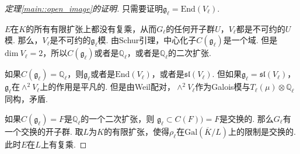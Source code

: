 \begin{proof}[定理\ref{main::open_image}的证明]
    只需要证明$\mathfrak{g}_{\ell} = \mathrm{End}(V_{\ell})$.

    $E$在$K$的所有有限扩张上都没有复乘，从而$G_{\ell}$的任何开子群$U$，$V_{\ell}$都是不可约的$U$模. 那么，$V_{\ell}$是不可约的$\mathfrak{g}_{\ell}$模. 由Schur引理，中心化子$C(\mathfrak{g}_{\ell})$是一个域. 但是$\mathrm{dim}\ V_{\ell}=2$，所以$C(\mathfrak{g}_{\ell})$或者是$\mathbb{Q}_{\ell}$，或者是$\mathbb{Q}_{\ell}$的二次扩张.

    如果$C(\mathfrak{g}_{\ell}) = \mathbb{Q}_{\ell}$，则$\mathfrak{g}_{\ell}$或者是$\mathrm{End}(V_{\ell})$，或者是$\mathfrak{sl}(V_{\ell})$. 但如果$\mathfrak{g}_{\ell} = \mathfrak{sl}(V_{\ell})$，$\mathfrak{g}_{\ell}$在$\wedge^2 V_{\ell}$上的作用是平凡的. 但是由Weil配对，$\wedge^2 V_{\ell}$作为Galois模与$T_{\ell}(\mu)\otimes \mathbb{Q}_{\ell}$同构，矛盾.

    如果$C(\mathfrak{g}_{\ell}) = F$是$\mathbb{Q}_{\ell}$的一个二次扩张，则
    $\mathfrak{g}_{\ell}\subset C(F)) = F$是交换的. 那么$G_{\ell}$有一个交换的开子群.
    取$L$为$K$的有限扩张，使得$\rho_{\ell}$在$\mathrm{Gal}(\overline{K}/L)$上的限制是交换的.
    此时$E$在$L$上有复乘.

\end{proof}
